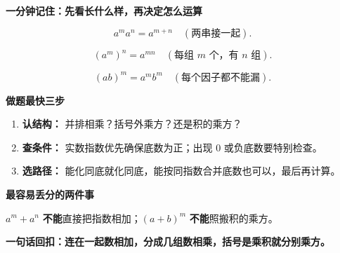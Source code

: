 \clearpage
\begin{summarybox}
    \textbf{\textcolor{CSummary}{一分钟记住：先看长什么样，再决定怎么运算}}\par
    \begin{description}[style=nextline,leftmargin=2.3em,itemsep=0.35em]
        \item[\textbf{同底相乘，指数加：}]
        \[a^ma^n=a^{m+n}\quad(\text{两串接一起}).\]
        \item[\textbf{幂的乘方，指数乘：}]
        \[(a^m)^n=a^{mn}\quad(\text{每组 $m$ 个，有 $n$ 组}).\]
        \item[\textbf{积的乘方，分别乘：}]
        \[(ab)^m=a^mb^m\quad(\text{每个因子都不能漏}).\]
    \end{description}
    \begin{center}
    
    \end{center}

    \textbf{\textcolor{CSummary}{做题最快三步}}\par
    \begin{enumerate}[leftmargin=*,itemsep=0.25em,topsep=0.3em]
        \item \textbf{认结构：} 并排相乘？括号外乘方？还是积的乘方？
        \item \textbf{查条件：} 实数指数优先确保底数为正；出现 $0$ 或负底数要特别检查。
        \item \textbf{选路径：} 能化同底就化同底，能按同指数合并底数也可以，最后再计算。
    \end{enumerate}

    \textbf{\textcolor{CSummary}{最容易丢分的两件事}}\par
    $a^m+a^n$ \textbf{不能}直接把指数相加；$(a+b)^m$ \textbf{不能}照搬积的乘方。

    \textbf{\textcolor{CSummary}{一句话回扣：}}\textbf{连在一起数相加，分成几组数相乘，括号是乘积就分别乘方。}
\end{summarybox}
